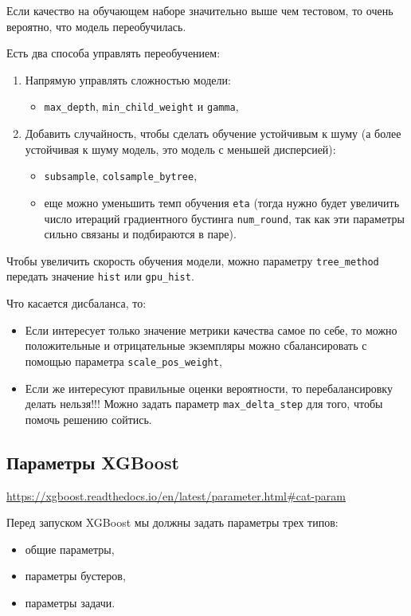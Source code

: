 \documentclass[%
	11pt,
	a4paper,
	utf8,
		]{article}
\begin{document}
Если качество на обучающем наборе значительно выше чем тестовом, то очень вероятно, что модель переобучилась.

Есть два способа управлять переобучением:
\begin{enumerate}
	\item Напрямую управлять сложностью модели:
	\begin{itemize}
		\item \verb|max_depth|, \verb|min_child_weight| и \verb|gamma|,
	\end{itemize}
	\item Добавить случайность, чтобы сделать обучение устойчивым к шуму (а более устойчивая к шуму модель, это модель с меньшей дисперсией):
	\begin{itemize}
		\item \verb|subsample|, \verb|colsample_bytree|,
		
		\item еще можно уменьшить темп обучения \verb|eta| (тогда нужно будет увеличить число итераций градиентного бустинга \verb|num_round|, так как эти параметры сильно связаны и подбираются в паре).
	\end{itemize}
\end{enumerate}

Чтобы увеличить скорость обучения модели, можно параметру \verb|tree_method| передать значение \verb|hist| или \verb|gpu_hist|.

Что касается дисбаланса, то:
\begin{itemize}
	\item Если интересует только значение метрики качества самое по себе, то можно положительные и отрицательные экземпляры можно сбалансировать с помощью параметра \verb|scale_pos_weight|,
	
	\item Если же интересуют правильные оценки вероятности, то перебалансировку делать нельзя!!! Можно задать параметр \verb|max_delta_step| для того, чтобы помочь решению сойтись.
\end{itemize}

\subsection{Параметры XGBoost}

\url{https://xgboost.readthedocs.io/en/latest/parameter.html#cat-param}

Перед запуском XGBoost мы должны задать параметры трех типов:
\begin{itemize}
	\item общие параметры,
	
	\item параметры бустеров,
	
	\item параметры задачи.
\end{itemize}
\end{document}
